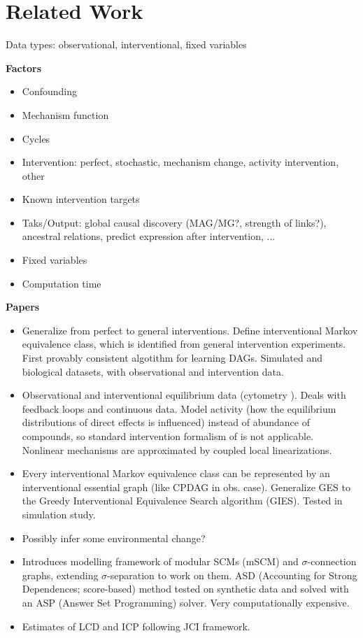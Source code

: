 \section*{Related Work}


Data types: observational, interventional, fixed variables

\textbf{Factors}
\begin{itemize}
    \item Confounding
    \item Mechanism function
    \item Cycles
    \item Intervention: perfect, stochastic, mechanism change, activity intervention, other
    \item Known intervention targets
    \item Taks/Output: global causal discovery (MAG/MG?, strength of links?), ancestral relations, predict expression after intervention, ...
    \item Fixed variables
    \item Computation time
\end{itemize}


\textbf{Papers}
\begin{itemize}
    \item [\cite{yang2018characterizing}] 
        Generalize \cite{hauser2012characterization} from perfect to general interventions. Define interventional Markov equivalence class, which is identified from general intervention experiments. First provably consistent algotithm for learning DAGs. Simulated and biological datasets, with observational and intervention data.
    \item [\cite{mooij2013cyclic}]
        Observational and interventional equilibrium data (cytometry \cite{sachs2005causal}). Deals with feedback loops and continuous data. Model activity (how the equilibrium distributions of direct effects is influenced) instead of abundance of compounds, so standard intervention formalism of \citet{pearl2009causality} is not applicable. Nonlinear mechanisms are approximated by coupled local linearizations. 
    \item [\cite{hauser2012characterization}]
        Every interventional Markov equivalence class can be represented by an interventional essential graph (like CPDAG in obs. case). Generalize GES to the Greedy Interventional Equivalence Search algorithm (GIES). Tested in simulation study.
    \item [\cite{tian2001causal}]
        Possibly infer some environmental change?
    \item [\cite{forre2018constraint}]
        Introduces modelling framework of modular SCMs (mSCM) and $\sigma$-connection graphs, extending $\sigma$-separation to work on them. ASD (Accounting for Strong Dependences; score-based) method tested on synthetic data and solved with an ASP (Answer Set Programming) solver. Very computationally expensive.
    \item [\cite{versteeg2019boosting}]
        Estimates of LCD and ICP following JCI framework. 
\end{itemize}


